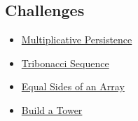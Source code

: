 \documentclass[12pt, a4paper]{article}
\begin{document}
\subsection{Challenges}
\label{sec:org7833473}
\begin{itemize}
\item \href{https://www.codewars.com/kata/55bf01e5a717a0d57e0000ec}{Multiplicative Persistence}
\item \href{https://www.codewars.com/kata/556deca17c58da83c00002db}{Tribonacci Sequence}
\item \href{https://www.codewars.com/kata/5679aa472b8f57fb8c000047}{Equal Sides of an Array}
\item \href{https://www.codewars.com/kata/576757b1df89ecf5bd00073b}{Build a Tower}
\end{itemize}
\end{document}
